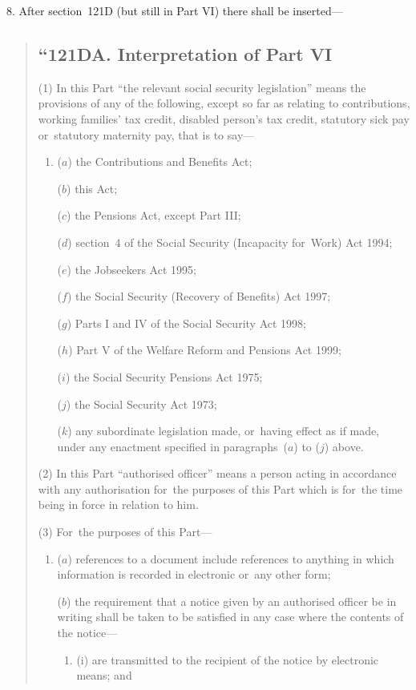 \documentclass[12pt,a4paper]{article}
\begin{document}
8. After section~121D (but still in Part VI) there shall be inserted—
\begin{quotation}
\subsection*{“121DA. Interpretation of Part VI}

(1) In this Part “the relevant social security legislation” means the provisions of any of the following, except so far as relating to contributions, working families' tax credit, disabled person’s tax credit, statutory sick pay or~statutory maternity pay, that is to say—
\begin{enumerate}\item[]
($a$) the Contributions and Benefits Act;

($b$) this Act;

($c$) the Pensions Act, except Part III;

($d$) section~4 of the Social Security (Incapacity for~Work) Act 1994;

($e$) the Jobseekers Act 1995;

($f$) the Social Security (Recovery of Benefits) Act 1997;

($g$) Parts I and IV of the Social Security Act 1998;

($h$) Part V of the Welfare Reform and Pensions Act 1999;

($i$) the Social Security Pensions Act 1975;

($j$) the Social Security Act 1973;

($k$) any subordinate legislation made, or~having effect as if made, under any enactment specified in paragraphs~($a$)  to ($j$)  above.
\end{enumerate}

(2) In this Part “authorised officer” means a person acting in accordance with any authorisation for~the purposes of this Part which is for~the time being in force in relation to him.

(3) For~the purposes of this Part—
\begin{enumerate}\item[]
($a$) references to a document include references to anything in which information is recorded in electronic or~any other form;

($b$) the requirement that a notice given by an authorised officer be in writing shall be taken to be satisfied in any case where the contents of the notice—
\begin{enumerate}\item[]
(i) are transmitted to the recipient of the notice by electronic means; and


\end{enumerate}
\end{enumerate}
\end{quotation}
\end{document}

